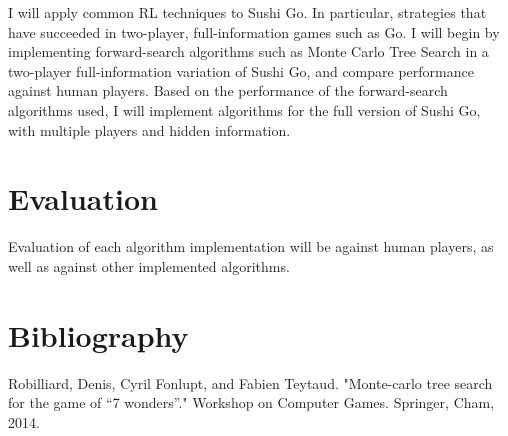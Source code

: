 \documentclass{article}
\begin{document}
I will apply common RL techniques to Sushi Go. In particular, strategies that have succeeded in two-player, full-information games such as Go. I will begin by implementing forward-search algorithms such as Monte Carlo Tree Search in a two-player full-information variation of Sushi Go, and compare performance against human players. Based on the performance of the forward-search algorithms used, I will implement algorithms for the full version of Sushi Go, with multiple players and hidden information.

\section{Evaluation}

Evaluation of each algorithm implementation will be against human players, as well as against other implemented algorithms.

\section{Bibliography}

Robilliard, Denis, Cyril Fonlupt, and Fabien Teytaud. "Monte-carlo tree search for the game of “7 wonders”." Workshop on Computer Games. Springer, Cham, 2014.
\end{document}
